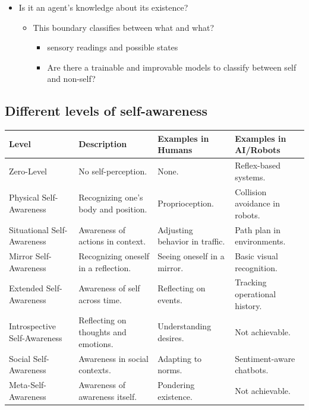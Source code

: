 \begin{itemize}
    \item Is it an agent's knowledge about its existence?

    \begin{itemize}
        \item This boundary classifies between what and what?
        \begin{itemize}
            \item sensory readings and possible states
            \item Are there a trainable and improvable models to classify between self and non-self?
        \end{itemize}
    \end{itemize}
\end{itemize}

\subsection{Different levels of self-awareness}
\begin{tabular}{|l|l|l|l|}
    \hline
    \textbf{Level}               & \textbf{Description}                 & \textbf{Examples in Humans}    & \textbf{Examples in AI/Robots} \\ \hline
    Zero-Level                   & No self-perception.                  & None.                          & Reflex-based systems.          \\ \hline
    Physical Self-Awareness      & Recognizing one’s body and position. & Proprioception.                & Collision avoidance in robots. \\ \hline
    Situational Self-Awareness   & Awareness of actions in context.     & Adjusting behavior in traffic. & Path plan in environments. \\ \hline
    Mirror Self-Awareness        & Recognizing oneself in a reflection. & Seeing oneself in a mirror. & Basic visual recognition. \\ \hline
    Extended Self-Awareness      & Awareness of self across time.       & Reflecting on events.          & Tracking operational history.  \\ \hline
    Introspective Self-Awareness & Reflecting on thoughts and emotions. & Understanding desires. & Not achievable. \\ \hline
    Social Self-Awareness        & Awareness in social contexts.        & Adapting to norms.             & Sentiment-aware chatbots.      \\ \hline
    Meta-Self-Awareness          & Awareness of awareness itself.       & Pondering existence.           & Not achievable.                \\ \hline
\end{tabular}

